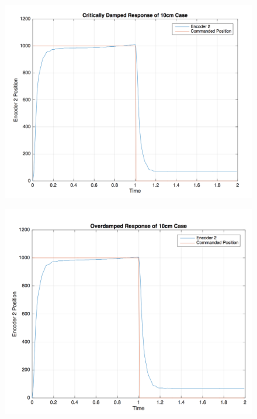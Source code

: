\documentclass[12pt, a4paper]{article}
\begin{document}
\begin{figure}[H]
\centering
\includegraphics[width = \textwidth]{cd_m1.png}
\end{figure}
\begin{figure}[H]
\centering
\includegraphics[width = \textwidth]{od_m1.png}
\end{figure}
\end{document}
